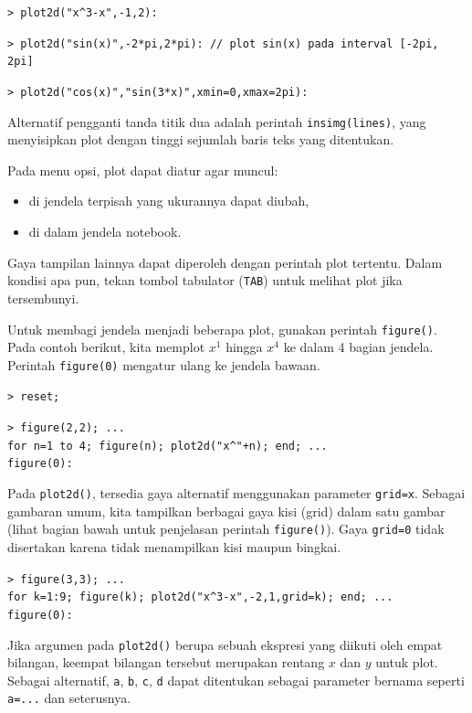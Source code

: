 \documentclass[11pt, a4paper]{article}
\newcommand{\emtcmd}[1]{\noindent\texttt{\textcolor{emtcommand}{>}\ #1}\par\smallskip}
\begin{document}
\emtcmd{plot2d("x\^{}3-x",-1,2):}
\emtcmd{plot2d("sin(x)",-2*pi,2*pi): \textcolor{emtcomment}{// plot sin(x) pada interval [-2pi, 2pi]}}
\emtcmd{plot2d("cos(x)","sin(3*x)",xmin=0,xmax=2pi):}

Alternatif pengganti tanda titik dua adalah perintah \texttt{insimg(lines)}, yang menyisipkan plot dengan tinggi sejumlah baris teks yang ditentukan.

Pada menu opsi, plot dapat diatur agar muncul:
\begin{itemize}
    \item di jendela terpisah yang ukurannya dapat diubah,
    \item di dalam jendela notebook.
\end{itemize}

Gaya tampilan lainnya dapat diperoleh dengan perintah plot tertentu. Dalam kondisi apa pun, tekan tombol tabulator (\texttt{TAB}) untuk melihat plot jika tersembunyi.

Untuk membagi jendela menjadi beberapa plot, gunakan perintah \texttt{figure()}. Pada contoh berikut, kita memplot $x^1$ hingga $x^4$ ke dalam 4 bagian jendela. Perintah \texttt{figure(0)} mengatur ulang ke jendela bawaan.

\emtcmd{reset;}
\emtcmd{figure(2,2); ... \\
\hspace*{1em} for n=1 to 4; figure(n); plot2d("x\^{}"+n); end; ... \\
\hspace*{1em} figure(0):}

Pada \texttt{plot2d()}, tersedia gaya alternatif menggunakan parameter \texttt{grid=x}. Sebagai gambaran umum, kita tampilkan berbagai gaya kisi (grid) dalam satu gambar (lihat bagian bawah untuk penjelasan perintah \texttt{figure()}). Gaya \texttt{grid=0} tidak disertakan karena tidak menampilkan kisi maupun bingkai.

\emtcmd{figure(3,3); ... \\
\hspace*{1em} for k=1:9; figure(k); plot2d("x\^{}3-x",-2,1,grid=k); end; ... \\
\hspace*{1em} figure(0):}

Jika argumen pada \texttt{plot2d()} berupa sebuah ekspresi yang diikuti oleh empat bilangan, keempat bilangan tersebut merupakan rentang $x$ dan $y$ untuk plot. Sebagai alternatif, \texttt{a}, \texttt{b}, \texttt{c}, \texttt{d} dapat ditentukan sebagai parameter bernama seperti \texttt{a=...} dan seterusnya.
\end{document}
